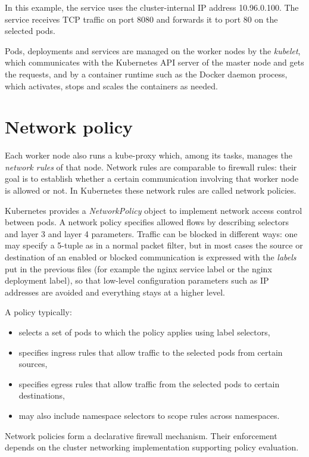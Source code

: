 In this example, the service uses the cluster-internal IP address 10.96.0.100. The service receives TCP traffic on port 8080 and forwards it to port 80 on the selected pods.

Pods, deployments and services are managed on the worker nodes by the \emph{kubelet}, which communicates with the Kubernetes API server of the master node and gets the requests, and by a container runtime such as the Docker daemon process, which activates, stops and scales the containers as needed.

\section{Network policy}

Each worker node also runs a kube-proxy which, among its tasks, manages the \emph{network rules} of that node. Network rules are comparable to firewall rules: their goal is to establish whether a certain communication involving that worker node is allowed or not. In Kubernetes these network rules are called network policies.

Kubernetes provides a \emph{NetworkPolicy} object to implement network access control between pods. A network policy specifies allowed flows by describing selectors and layer 3 and layer 4 parameters. Traffic can be blocked in different ways: one may specify a 5-tuple as in a normal packet filter, but in most cases the source or destination of an enabled or blocked communication is expressed with the \emph{labels} put in the previous files (for example the nginx service label or the nginx deployment label), so that low-level configuration parameters such as IP addresses are avoided and everything stays at a higher level.

A policy typically:

\begin{itemize}
\item selects a set of pods to which the policy applies using label selectors,
\item specifies ingress rules that allow traffic to the selected pods from certain sources,
\item specifies egress rules that allow traffic from the selected pods to certain destinations,
\item may also include namespace selectors to scope rules across namespaces.
\end{itemize}

Network policies form a declarative firewall mechanism. Their enforcement depends on the cluster networking implementation supporting policy evaluation.

